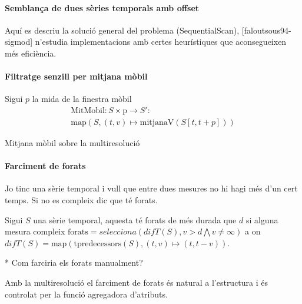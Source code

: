\paragraph{Semblança de dues sèries temporals amb offset}

Aquí es descriu la solució general del problema (SequentialScan),
[faloutsous94-sigmod] n'estudia implementacions amb certes
heurístiques que aconsegueixen més eficiència.





\paragraph{Filtratge senzill per mitjana mòbil}

Sigui $p$ la mida de la finestra mòbil
\begin{gather*}
  \text{MitMobil}: S \times \text{p} \longrightarrow S':\\
  \text{map}(S,(t,v)\mapsto \text{mitjanaV}(S[t,t+p]))
\end{gather*}


Mitjana mòbil sobre la multiresolució



\paragraph{Farciment de forats}

Jo tinc una sèrie temporal i vull que entre dues mesures no hi hagi més d'un cert temps. Si no es compleix dic que té forats. 

Sigui $S$ una sèrie temporal, aquesta té forats de més durada que $d$
si alguna mesura compleix $\text{forats} = selecciona(difT(S),v>d \bigwedge v\neq\infty)$ a on $difT(S) = \text{map}(\text{tpredecessors}(S),(t,v)\mapsto(t,t-v))$.

* Com farciria els forats manualment?


Amb la multiresolució el farciment de forats és natural a l'estructura i és controlat per la funció agregadora d'atributs.






